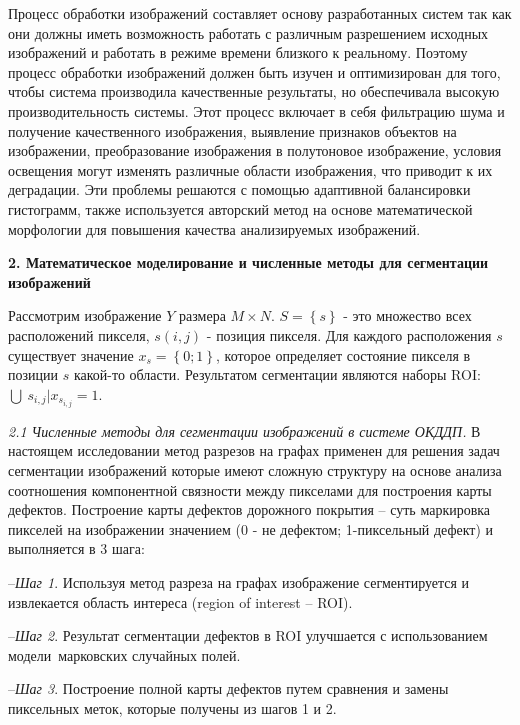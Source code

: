Процесс обработки изображений составляет основу разработанных систем так как они должны иметь возможность работать с различным разрешением исходных изображений и работать в режиме времени близкого к реальному. Поэтому процесс обработки изображений должен быть изучен и оптимизирован для того, чтобы система производила качественные результаты, но обеспечивала высокую производительность системы. Этот процесс включает в себя фильтрацию шума и получение качественного изображения, выявление признаков объектов на изображении, преобразование изображения в полутоновое изображение, условия освещения могут изменять различные области изображения, что приводит к их деградации. Эти проблемы решаются с помощью адаптивной балансировки гистограмм, также используется авторский метод на основе математической морфологии для повышения качества анализируемых изображений.

\textbf{2. Математическое моделирование и численные методы для сегментации изображений}

Рассмотрим изображение $Y$ размера $M \times N$. $S = \left\{s\right\}$ - это множество всех расположений пикселя, $s \left(i, j\right)$ - позиция пикселя. Для каждого расположения $s$ существует значение $x_s=\left\{0;1\right\}$, которое определяет состояние пикселя в позиции $s$ какой-то области. Результатом сегментации являются наборы ROI: $\bigcup\ s_{i,j} | x_{s_{i,j}}=1$.

\textit{2.1 Численные методы для сегментации изображений в системе ОКДДП.} В настоящем исследовании метод разрезов на графах применен для решения задач сегментации изображений которые имеют сложную структуру на основе анализа соотношения компонентной связности между пикселами для построения карты дефектов. Построение карты дефектов дорожного покрытия -- суть маркировка пикселей на изображении значением (0 - не дефектом; 1-пиксельный дефект) и выполняется в 3 шага:

--\textit{Шаг 1}. Используя метод разреза на графах изображение сегментируется и извлекается область интереса (region of interest -- ROI).

--\textit{Шаг 2}. Результат сегментации дефектов в ROI улучшается с использованием модели марковских случайных полей.

--\textit{Шаг 3}. Построение полной карты дефектов путем сравнения и замены пиксельных меток, которые получены из шагов 1 и 2.


